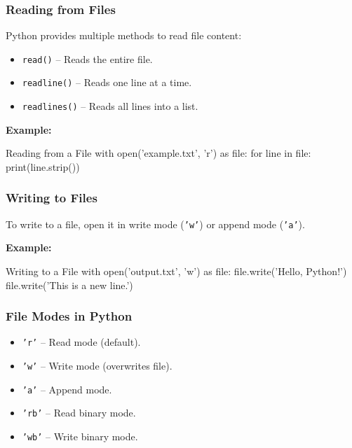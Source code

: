 \subsubsection{Reading from Files}

Python provides multiple methods to read file content:
\begin{itemize}
    \item \texttt{read()} – Reads the entire file.
    \item \texttt{readline()} – Reads one line at a time.
    \item \texttt{readlines()} – Reads all lines into a list.
\end{itemize}

\textbf{Example:}
\begin{codeonly}{Reading from a File}
with open('example.txt', 'r') as file:
    for line in file:
        print(line.strip())
\end{codeonly}

%
\subsubsection{Writing to Files}

To write to a file, open it in write mode (\texttt{'w'}) or append mode (\texttt{'a'}).

\textbf{Example:}
\begin{codeonly}{Writing to a File}
with open('output.txt', 'w') as file:
    file.write('Hello, Python!\n')
    file.write('This is a new line.')
\end{codeonly}

%
\subsubsection{File Modes in Python}

\begin{itemize}
    \item \texttt{'r'} – Read mode (default).
    \item \texttt{'w'} – Write mode (overwrites file).
    \item \texttt{'a'} – Append mode.
    \item \texttt{'rb'} – Read binary mode.
    \item \texttt{'wb'} – Write binary mode.
\end{itemize}

